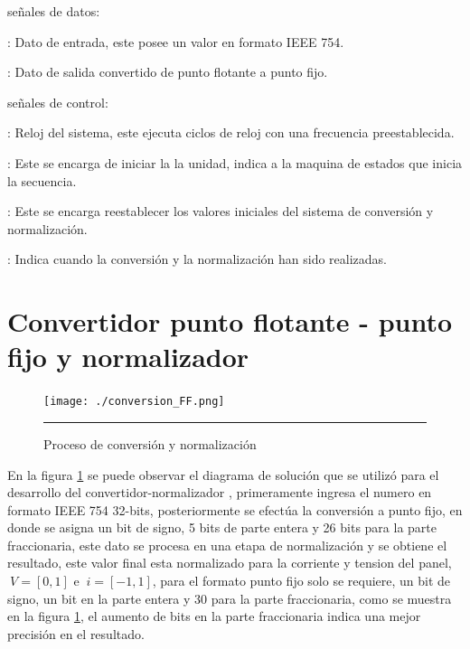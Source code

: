 señales de datos: 

\begin{compactitem}

\item {}: Dato de entrada, este posee un valor en formato IEEE 754.
\item {}: Dato de salida convertido de punto flotante a punto fijo.

\end{compactitem}

señales de control: 

\begin{compactitem}

\item {}: Reloj del sistema, este ejecuta ciclos de reloj con una frecuencia preestablecida. 

\item {}: Este se encarga de iniciar la la unidad, indica a la maquina de estados que inicia la secuencia. 

\item {}: Este se encarga reestablecer los valores iniciales del sistema de conversión y normalización.

\item {}: Indica cuando la conversión y la normalización han sido realizadas.

\end{compactitem}


 

\section{Convertidor punto flotante - punto fijo y normalizador }


\begin{figure}[H]
  \centering
    \texttt{[image: ./conversion\_FF.png]}
    \rule{35em}{0.5pt}
  \caption[conversión y normalización]{Proceso de conversión y normalización  }
  \label{fig:FF}
\end{figure}



  En la figura \ref{fig:FF} se puede observar el diagrama de solución que se utilizó para el desarrollo del convertidor-normalizador , primeramente ingresa el numero en formato IEEE 754 32-bits, posteriormente se efectúa la conversión a punto fijo, en donde se asigna un bit de signo, 5 bits de parte entera y 26 bits para la parte fraccionaria, este dato se procesa en una etapa de normalización y se obtiene el resultado, este valor final esta normalizado para la corriente y tension del panel, $\ V = [0,1]$ e $\ i = [-1,1]$, para el formato punto fijo solo se requiere, un bit de signo, un bit en la parte entera y 30 para la parte fraccionaria, como se muestra en la figura \ref{fig:FF}, el aumento de bits en la parte fraccionaria indica una mejor precisión en el resultado. 

